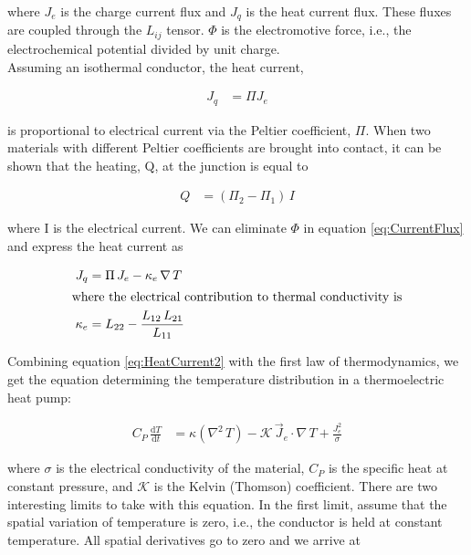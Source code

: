 \documentclass{article}
\begin{document}
\noindent where \(J_e\) is the charge current flux and \(J_q\) is the heat current flux. These fluxes are coupled through the \(L_{ij}\) tensor. \(\Phi\) is the electromotive force, i.e., the electrochemical potential divided by unit charge.\\


\noindent Assuming an isothermal conductor, the heat current,

\begin{align}
\label{eq:PeltierProportionality}
J_q &= \Pi J_e
\end{align}

\noindent is proportional to electrical current via the Peltier coefficient, \(\Pi\). When two materials with different Peltier coefficients are brought into contact, it can be shown that the heating, Q, at the junction is equal to

\begin{align}
\label{eq:HeatingCooling}
	Q &= \left(\Pi_2 - \Pi_1\right) \, I
\end{align}

\noindent where I is the electrical current. We can eliminate \(\Phi\) in equation \ref{eq:CurrentFlux} and express the heat current as

\begin{align}
\label{eq:HeatCurrent2}
	J_q &= \Pi \, J_e - \kappa_e \, \nabla \, T \\
	\intertext{where the electrical contribution to thermal conductivity is}
\;
\label{eq:ElectronicConductivity}
	\kappa_e &= L_{22} - \frac{L_{12} \, L_{21}}{L_{11}}
\end{align}

\noindent Combining equation \ref{eq:HeatCurrent2} with the first law of thermodynamics, we get the equation determining the temperature distribution in a thermoelectric heat pump:

\begin{align}
\label{eq:TemperatureDistribution}
	C_P \, \frac{\mathrm{d}T}{\mathrm{d}t} &= \kappa \left(\nabla^2 \, T \right) - \mathcal{K} \, \vec{J}_e \cdot \nabla \, T + \frac{J_e^2}{\sigma}
\end{align}

\noindent where \(\sigma\) is the electrical conductivity of the material, \(C_P\) is the specific heat at constant pressure, and \(\mathcal{K}\) is the Kelvin (Thomson) coefficient. There are two interesting limits to take with this equation. In the first limit, assume that the spatial variation of temperature is zero, i.e., the conductor is held at constant temperature. All spatial derivatives go to zero and we arrive at
\end{document}
